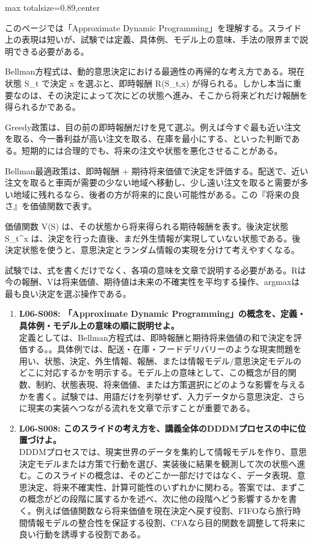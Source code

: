 \begin{minipage}[t]{0.58\textwidth}
\begin{adjustbox}{max totalsize={\textwidth}{0.89\textheight},center}
\begin{minipage}{\textwidth}\scriptsize
{}このページでは「Approximate Dynamic Programming」を理解する。スライド上の表現は短いが、試験では定義、具体例、モデル上の意味、手法の限界まで説明できる必要がある。\par
Bellman方程式は、動的意思決定における最適性の再帰的な考え方である。現在状態 S\_t で決定 x を選ぶと、即時報酬 R(S\_t,x) が得られる。しかし本当に重要なのは、その決定によって次にどの状態へ進み、そこから将来どれだけ報酬を得られるかである。\par
Greedy政策は、目の前の即時報酬だけを見て選ぶ。例えば今すぐ最も近い注文を取る、今一番利益が高い注文を取る、在庫を最小にする、といった判断である。短期的には合理的でも、将来の注文や状態を悪化させることがある。\par
Bellman最適政策は、即時報酬 + 期待将来価値で決定を評価する。配送で、近い注文を取ると車両が需要の少ない地域へ移動し、少し遠い注文を取ると需要が多い地域に残れるなら、後者の方が将来的に良い可能性がある。この『将来の良さ』を価値関数で表す。\par
価値関数 V(S) は、その状態から将来得られる期待報酬を表す。後決定状態 S\_t\textasciicircum{}x は、決定を行った直後、まだ外生情報が実現していない状態である。後決定状態を使うと、意思決定とランダム情報の実現を分けて考えやすくなる。\par
試験では、式を書くだけでなく、各項の意味を文章で説明する必要がある。Rは今の報酬、Vは将来価値、期待値は未来の不確実性を平均する操作、argmaxは最も良い決定を選ぶ操作である。\par{}\begin{enumerate}\item \textbf{L06-S008: 「Approximate Dynamic Programming」の概念を、定義・具体例・モデル上の意味の順に説明せよ。}\\定義としては、Bellman方程式は、即時報酬と期待将来価値の和で決定を評価する。。具体例では、配送・在庫・フードデリバリーのような現実問題を用い、状態、決定、外生情報、報酬、または情報モデル/意思決定モデルのどこに対応するかを明示する。モデル上の意味として、この概念が目的関数、制約、状態表現、将来価値、または方策選択にどのような影響を与えるかを書く。試験では、用語だけを列挙せず、入力データから意思決定、さらに現実の実装へつながる流れを文章で示すことが重要である。\item \textbf{L06-S008: このスライドの考え方を、講義全体のDDDMプロセスの中に位置づけよ。}\\DDDMプロセスでは、現実世界のデータを集約して情報モデルを作り、意思決定モデルまたは方策で行動を選び、実装後に結果を観測して次の状態へ進む。このスライドの概念は、そのどこか一部だけではなく、データ表現、意思決定、将来不確実性、計算可能性のいずれかに関わる。答案では、まずこの概念がどの段階に属するかを述べ、次に他の段階へどう影響するかを書く。例えば価値関数なら将来価値を現在決定へ戻す役割、FIFOなら旅行時間情報モデルの整合性を保証する役割、CFAなら目的関数を調整して将来に良い行動を誘導する役割である。\end{enumerate}

\end{minipage}
\end{adjustbox}
\end{minipage}
